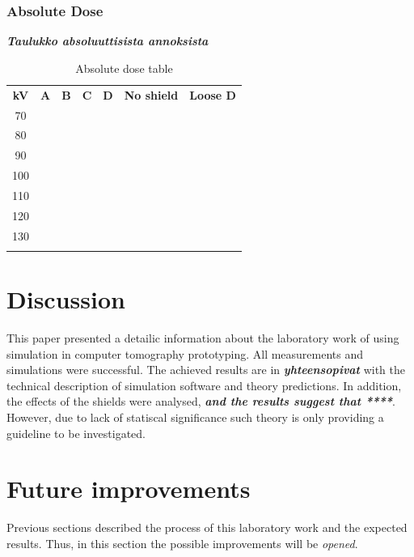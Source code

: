 \documentclass[fleqn,10pt]{SelfArx} %
\begin{document}
\subsubsection{Absolute Dose}
\textit{\textbf{Taulukko absoluuttisista annoksista}}
\begin{table}[!hbt]
	\caption{Absolute dose table}
	\centering
	
	\label{tab:DoseCalculationCoefficient}
	\begin{tabulary}{\linewidth}[hbt]{||c|c|c|c|c|c|c||}
		\textbf{kV} & \textbf{A} & \textbf{B} & \textbf{C} & \textbf{D} & \textbf{No shield} & \textbf{Loose D}\\
		\hhline{|:=|=|=|=|=|=|=:|}
		70 &  &  &  &  &  &  \\
		\hhline{||-------||}
		80 &  &  &  &  &  &  \\
		\hhline{||-------||}
		90 &  &  &  &  &  &  \\
		\hhline{||-------||}
		100 &  &  &  &  &  &  \\
		\hhline{||-------||}
		110 &  &  &  &  &  &  \\
		\hhline{||-------||}
		120 &  &  &  &  &  &  \\
		\hhline{||-------||}
		130 &  &  &  &  &  &  \\
		
		
	\end{tabulary}
\end{table}



\section{Discussion}
This paper presented a detailic information about the laboratory work of using simulation in computer tomography prototyping. All measurements and simulations were successful. The achieved results are in \textbf{\textit{yhteensopivat}} with the technical description of simulation software and theory predictions. In addition, the effects of the shields were analysed, \textbf{\textit{and the results suggest that ****}}. However, due to lack of statiscal significance such theory is only providing a guideline to be investigated.

\section{Future improvements}
Previous sections described the process of this laboratory work and the expected results. Thus, in this section the possible improvements will be \textit{opened}.
\end{document}
